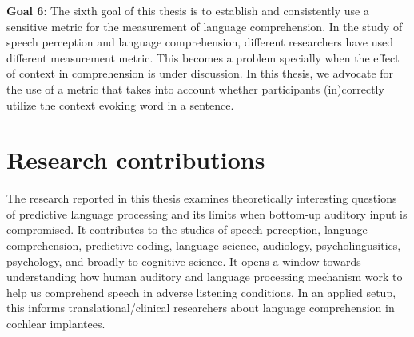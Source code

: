 \documentclass[a4paper, nobind]{templates/ociamthesis}
\begin{document}
\textbf{Goal 6}:
The sixth goal of this thesis is to establish and consistently use a sensitive metric for the measurement of language comprehension.
In the study of speech perception and language comprehension, different researchers have used different measurement metric.
This becomes a problem specially when the effect of context in comprehension is under discussion.
In this thesis, we advocate for the use of a metric that takes into account whether participants (in)correctly utilize the context evoking word in a sentence.

\hypertarget{research-contributions}{%
\section{Research contributions}\label{research-contributions}}

The research reported in this thesis examines theoretically interesting questions of predictive language processing and its limits when bottom-up auditory input is compromised.
It contributes to the studies of speech perception, language comprehension, predictive coding, language science, audiology, psycholingusitics, psychology, and broadly to cognitive science.
It opens a window towards understanding how human auditory and language processing mechanism work to help us comprehend speech in adverse listening conditions.
In an applied setup, this informs translational/clinical researchers about language comprehension in cochlear implantees.
\end{document}
